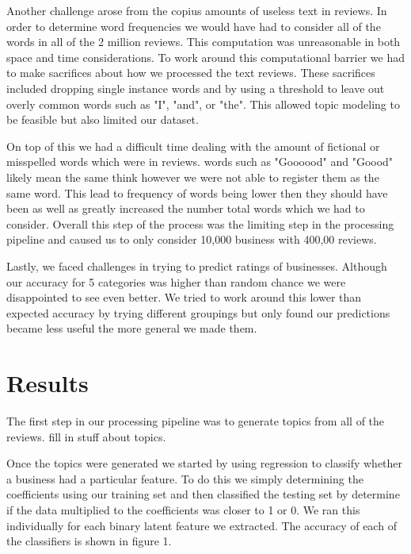 \documentclass{article}
\begin{document}
Another challenge arose from the copius amounts of useless text in reviews.  In order to determine word frequencies we would have had to consider all of the words in all of the 2 million reviews.  This computation was unreasonable in both space and time considerations.  To work around this computational barrier we had to make sacrifices about how we processed the text reviews.  These sacrifices included dropping single instance words and by using a threshold to leave out overly common words such as "I", "and", or "the".  This allowed topic modeling to be feasible but also limited our dataset.

On top of this we had a difficult time dealing with the amount of fictional or misspelled  words which were in reviews. words such as "Goooood" and "Goood" likely mean the same think however we were not able to register them as the same word. This lead to frequency of words being lower then they should have been as well as greatly increased the number total words which we had to consider. Overall this step of the process was the limiting step in the processing pipeline and caused us to only consider 10,000 business with 400,00 reviews.

Lastly, we faced challenges in trying to predict ratings of businesses.  Although our accuracy for 5 categories was higher than random chance we were disappointed to see even better.  We tried to work around this lower than expected accuracy by trying different groupings but only found our predictions became less useful the more general we made them.

\section{Results}

The first step in our processing pipeline was to generate topics from all of the reviews.  fill in stuff about topics.

Once the topics were generated we started by using regression to classify whether a business had a particular feature. To do this we simply determining the coefficients using our training set and then classified the testing set by determine if the data multiplied to the coefficients was closer to 1 or 0. We ran this individually for each binary latent feature we extracted. The accuracy of each of the classifiers is shown in figure 1.
\end{document}
